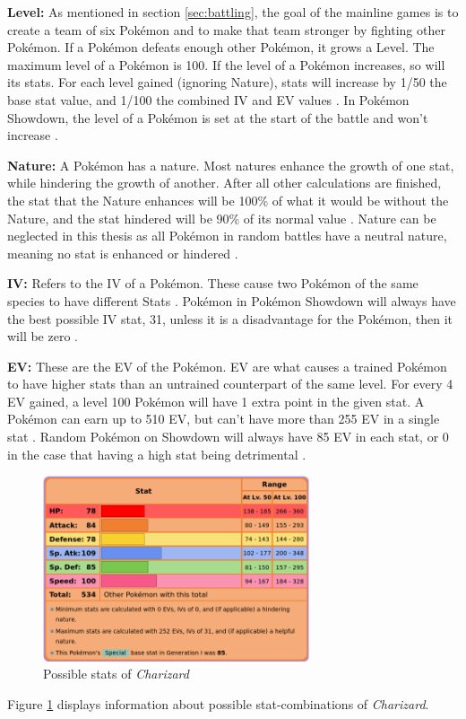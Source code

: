 \textbf{Level:} As mentioned in section \ref{sec:battling}, the goal of the mainline games is to create 
a team of six Pokémon and to make that team stronger by fighting other Pokémon. If a Pokémon defeats
enough other Pokémon, it grows a Level. The maximum level of a Pokémon is 100. If the level of a Pokémon
increases, so will its stats. For each level gained (ignoring Nature), stats will increase by 1/50 the
base stat value, and 1/100 the combined \ac{IV} and \ac{EV} values \cite{Bulbapedia:Stat}. 
In Pokémon Showdown, the level of  a Pokémon is set at the start of the battle and won't 
increase \cite{Smogon:RandBatsGuide}.

\textbf{Nature:} A Pokémon has a nature. Most natures enhance the growth of one stat, while hindering
the growth of another. After all other calculations are finished, the stat that the Nature enhances will
be 100\% of what it would be without the Nature, and the stat hindered will be 90\% of its normal value
\cite{Bulbapedia:Stat}. Nature can be neglected in this thesis as all Pokémon in random battles have
a neutral nature, meaning no stat is enhanced or hindered \cite{Smogon:RandBatsGuide}.

\textbf{IV:} Refers to the \ac{IV} of a Pokémon. These cause two Pokémon of the same species to have
different Stats \cite{Bulbapedia:Stat}. Pokémon in Pokémon Showdown will always have the best possible \ac{IV} 
stat, 31, unless it is a disadvantage for the Pokémon, then it will be zero \cite{Smogon:RandBatsGuide}.

\textbf{EV:} These are the \ac{EV} of the Pokémon. \ac{EV} are what causes a trained Pokémon to have higher
stats than an untrained counterpart of the same level. For every 4 \ac{EV} gained, a level 100 Pokémon 
will have 1 extra point in the given stat. A Pokémon can earn up to 510 \ac{EV}, but can't have more than
255 \ac{EV} in a single stat \cite{Bulbapedia:Stat}. Random Pokémon on Showdown will always have 85 
\ac{EV} in each stat, or 0 in the case that having a high stat being detrimental \cite{Smogon:RandBatsGuide}.

\begin{figure}[h]
	\centering
	\includegraphics[width=0.7\textwidth]{images/charizard-stats.png}
	\caption{Possible stats of \textit{Charizard} \cite{Bulbapedia:Charizard}}
	\label{fig:charizard-stats}
\end{figure}
Figure \ref{fig:charizard-stats} displays information about possible stat-combinations of 
\textit{Charizard}. 

